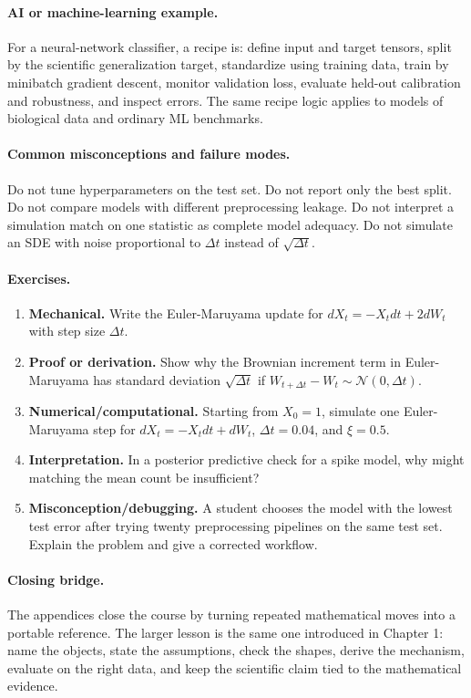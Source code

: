 \paragraph{AI or machine-learning example.}
For a neural-network classifier, a recipe is: define input and target tensors, split by the scientific generalization target, standardize using training data, train by minibatch gradient descent, monitor validation loss, evaluate held-out calibration and robustness, and inspect errors. The same recipe logic applies to models of biological data and ordinary ML benchmarks.

\paragraph{Common misconceptions and failure modes.}
Do not tune hyperparameters on the test set. Do not report only the best split. Do not compare models with different preprocessing leakage. Do not interpret a simulation match on one statistic as complete model adequacy. Do not simulate an SDE with noise proportional to \(\Delta t\) instead of \(\sqrt{\Delta t}\).

\paragraph{Exercises.}
\begin{enumerate}[label=\textbf{54.4.\arabic*.}, leftmargin=*]
\item \textbf{Mechanical.} Write the Euler-Maruyama update for \(dX_t=-X_tdt+2dW_t\) with step size \(\Delta t\).
\item \textbf{Proof or derivation.} Show why the Brownian increment term in Euler-Maruyama has standard deviation \(\sqrt{\Delta t}\) if \(W_{t+\Delta t}-W_t\sim\mathcal N(0,\Delta t)\).
\item \textbf{Numerical/computational.} Starting from \(X_0=1\), simulate one Euler-Maruyama step for \(dX_t=-X_tdt+dW_t\), \(\Delta t=0.04\), and \(\xi=0.5\).
\item \textbf{Interpretation.} In a posterior predictive check for a spike model, why might matching the mean count be insufficient?
\item \textbf{Misconception/debugging.} A student chooses the model with the lowest test error after trying twenty preprocessing pipelines on the same test set. Explain the problem and give a corrected workflow.
\end{enumerate}

\paragraph{Closing bridge.}
The appendices close the course by turning repeated mathematical moves into a portable reference. The larger lesson is the same one introduced in Chapter 1: name the objects, state the assumptions, check the shapes, derive the mechanism, evaluate on the right data, and keep the scientific claim tied to the mathematical evidence.

\clearpage
